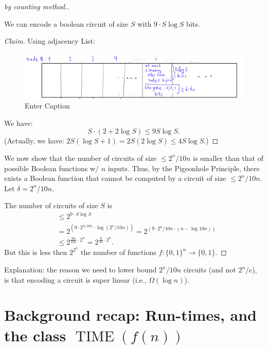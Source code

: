 \begin{proof}[by counting method.]
\mbox{}\\

\begin{claim}
We can encode a boolean circuit of size $S$ with $9\cdot S \log S$ bits.
\end{claim}

\begin{proof}[Claim]
Using adjacency List:
\begin{figure}
    \centering
    \includegraphics[width=1\linewidth]{images/shannon table.png}
    \caption{Enter Caption}
    \label{fig:enter-label}
\end{figure}




We have:
$$
S \cdot(2+2 \log S) \leq 9 S \log S
.$$
(Actually, we have: 
$ 2S(\log S+1) = 2S(2 \log S) \leq 4 S \log S.
$)
\end{proof}

We now show that the number of circuits of size $\leq 2^n / 10 n$ is smaller than that of possible Boolean functions w/ $n$ inputs.
Thus, by the Pigeonhole Principle, there exists a Boolean function that cannot be computed by a circuit of size $\leq 2^n / 10 n$. Let $\delta=2^n / 10n$.

The number of circuits of size $S$ is
$$
\begin{aligned}
& \leq 2^{9 \cdot S \log S} \\
& =2^{\left(9 \cdot 2^{n / 10 n} \cdot \log \left(2^n / 10 n\right)\right)}=2^{\left(9 \cdot 2^n / 10 n \cdot(n-\log 10 n)\right)} \\
& \leq 2^{\frac{9 n}{10 n} \cdot 2^n}=2^{\frac{9}{10} \cdot 2^n} . 
\end{aligned}
$$
But this is 
less then $2^{2^n}$ the number of functions $f:\{0,1\}^n\to\{0,1\}$. 
\end{proof}




Explanation: the reason we need to lower bound $2^n/10n$ circuits (and not $2^n/c$), is that encoding a circuit is super linear (i.e., $\Omega (\log n)$).



\section{Background recap: Run-times, and the class
 $\operatorname{TIME}(f(n))$}

